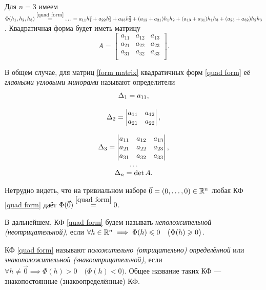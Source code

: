 \documentclass[../../main.tex]{subfiles}
\begin{document}
	\begin{exmp}
		Для $n = 3$ имеем $\Phi(h_1, h_2, h_3) \stk{quad form}{=} \ldots
		= a_{1 1} h_1^2 + a_{2 2} h_2^2 + a_{3 3} h_3^2
		+ (a_{1 2} + a_{2 1}) h_1 h_2 + (a_{1 3} + a_{3 1}) h_1 h_3
		+ (a_{2 3} + a_{3 2}) h_2 h_3$.
		Квадратичная форма будет иметь матрицу
		\[
			A =
			\begin{bmatrix}
				a_{1 1} & a_{1 2} & a_{1 3} \\
				a_{2 1} & a_{2 2} & a_{2 3} \\
				a_{3 1} & a_{3 2} & a_{3 3} \\
			\end{bmatrix}.
		\]
	\end{exmp}
	В общем случае, для матриц \eqref{form matrix} квадратичных форм
	\eqref{quad form} её \emph{главными угловыми минорами} называют
	определители
	\begin{equation}
	\label{main corner minors}
	\begin{array}{c}
		\Delta_1 = a_{1 1}, \\ \\
		\Delta_2 =
		\begin{vmatrix}
			a_{1 1} & a_{1 2} \\
			a_{2 1} & a_{2 2} \\
		\end{vmatrix}, \\ \\
		\Delta_3 =
		\begin{vmatrix}
			a_{1 1} & a_{1 2} & a_{1 3} \\
			a_{2 1} & a_{2 2} & a_{2 3} \\
			a_{3 1} & a_{3 2} & a_{3 3} \\
		\end{vmatrix}, \\
		\dots \\
		\Delta_n = \det A.
    \end{array}
	\end{equation}
	
	Нетрудно видеть, что на тривиальном наборе
	$\vec{0} = (0, \ldots, 0) \in \mathbb{R}^n$ любая КФ \eqref{quad form}
	даёт $\Phi(\vec{0}) \stk{quad form}{=} 0$.
	
	В дальнейшем, КФ \eqref{quad form} будем называть \emph{неположительной
	(неотрицательной)}, если $\forall h \in \mathbb{R}^n \implies
	\Phi(h) \leqslant 0
	\quad \big(\Phi(h) \geqslant 0\big)$.
	
	КФ \eqref{quad form} называют \emph{положительно (отрицательно) определённой}
	или \emph{знакоположительной (знакоотрицательной)},
	если $\forall h \ne \vec{0} \implies \Phi(h) > 0 \quad \big(\Phi(h) < 0\big)$.
	Общее название таких КФ --- знакопостоянные (знакоопределённые) КФ.
	
\end{document}
